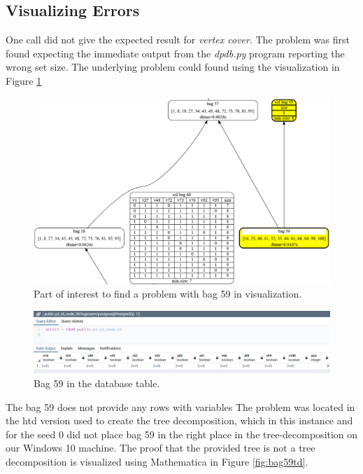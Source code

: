 \documentclass[a4paper, 12pt, bibliography=totoc]{scrartcl}
\begin{document}
\subsection{Visualizing Errors}
 
 One call did not give the expected result for \textit{vertex cover}. The problem was first found expecting the immediate output from the \textit{dpdb.py} program reporting the wrong set size. The underlying problem could found using the visualization in Figure \ref{fig:starsbag59}

\begin{figure}[H]
	\centering
	\vspace{1em}
	\includegraphics[width=0.9\linewidth,height=0.9\textheight,keepaspectratio]{images/starsbag59.png}
		\vspace{1em}
	\caption{Part of interest to find a problem with bag 59 in visualization. }
	\label{fig:starsbag59}
\end{figure}

\begin{figure}[H]
	\centering
	\includegraphics[width=0.9\linewidth,height=0.9\textheight,keepaspectratio]{images/Found bag 59 in stars100 with seed0.png}
	\caption{Bag 59 in the database table.}
	\label{fig:bag59visu}
\end{figure}

The bag 59 does not provide any rows with variables 
The problem was located in the htd version used to create the tree decomposition, which in this instance and for the seed $0$ did not place bag 59 in the right place in the tree-decomposition on our Windows 10 machine. The proof that the provided tree is not a tree decomposition is visualized using Mathematica \cite{Mathematica} in Figure \ref{fig:bag59td}.
\end{document}
